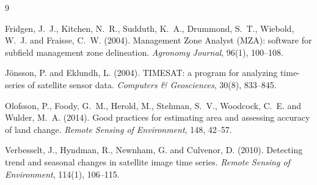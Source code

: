 \documentclass[11pt,a4paper]{article}
\begin{document}
\begin{thebibliography}{9}
\providecommand{\natexlab}[1]{#1}

Fridgen, J.~J., Kitchen, N.~R., Sudduth, K.~A., Drummond, S.~T., Wiebold,
W.~J. and Fraisse, C.~W. (2004).
Management Zone Analyst (MZA): software for subfield management zone
delineation.
\emph{Agronomy Journal}, 96(1), 100--108.

J\"onsson, P. and Eklundh, L. (2004).
TIMESAT: a program for analyzing time-series of satellite sensor data.
\emph{Computers \& Geosciences}, 30(8), 833--845.

Olofsson, P., Foody, G.~M., Herold, M., Stehman, S.~V., Woodcock, C.~E. and
Wulder, M.~A. (2014).
Good practices for estimating area and assessing accuracy of land change.
\emph{Remote Sensing of Environment}, 148, 42--57.

Verbesselt, J., Hyndman, R., Newnham, G. and Culvenor, D. (2010).
Detecting trend and seasonal changes in satellite image time series.
\emph{Remote Sensing of Environment}, 114(1), 106--115.

\end{thebibliography}
\end{document}
